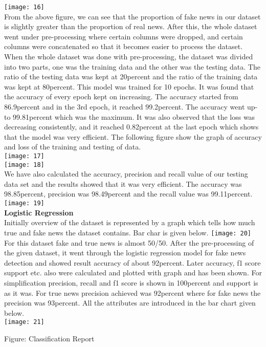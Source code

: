\documentclass[12pt]{article}
\begin{document}
\texttt{[image: 16]}\\
From the above figure, we can see that the proportion of fake news in our dataset is slightly greater than the proportion of real news.
After this, the whole dataset went under pre-processing where certain columns were dropped, and certain columns were concatenated so that it becomes easier to process the dataset. When the whole dataset was done with pre-processing, the dataset was divided into two parts, one was the training data and the other was the testing data. The ratio of the testing data was kept at 20percent and the ratio of the training data was kept at 80percent. This model was trained for 10 epochs. It was found that the accuracy of every epoch kept on increasing. The accuracy started from 86.9percent and in the 3rd epoch, it reached 99.2percent. The accuracy went up-to 99.81percent which was the maximum. It was also observed that the loss was decreasing consistently, and it reached 0.82percent at the last epoch which shows that the model was very efficient. The following figure show the graph of accuracy and loss of the training and testing of data.\\
\texttt{[image: 17]}\\
\texttt{[image: 18]}\\
We have also calculated the accuracy, precision and recall value of our testing data set and the results showed that it was very efficient. The accuracy was 98.85percent, precision was 98.49percent and the recall value was 99.11percent.\\
\texttt{[image: 19]}\\
\textbf{Logistic Regression}\\
Initially overview of the dataset is represented by a graph which tells how much true and fake news the dataset contains. Bar char is given below.
\texttt{[image: 20]}\\
For this dataset fake and true news is almost 50/50. After the pre-processing of the given dataset, it went through the logistic regression model for fake news detection and showed result accuracy of about 92percent. Later accuracy, f1 score support etc. also were calculated and plotted with graph and has been shown. For simplification precision, recall and f1 score is shown in 100percent and support is as it was. For true news precision achieved was 92percent where for fake news the precision was 93percent. All the attributes are introduced in the bar chart given below.\\
\texttt{[image: 21]}\\
\centerline{Figure: Classification Report\\}
\end{document}
